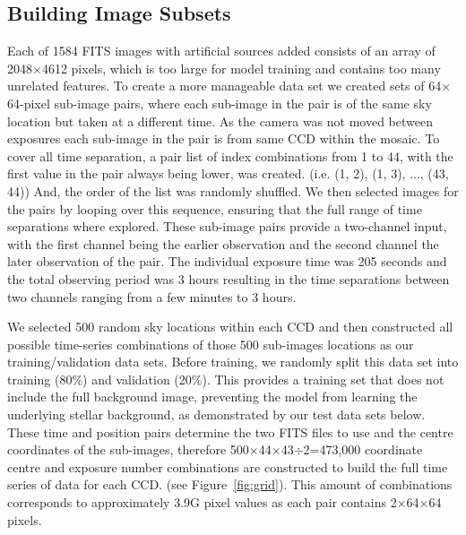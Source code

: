 \subsection{Building Image Subsets}
\label{subsect:subsets}
Each of 1584 FITS images with artificial sources added consists of an array of 2048$\times$4612 pixels, which is too large for model training and contains too many unrelated features.  
To create a more manageable data set we created sets of 64$\times$64-pixel sub-image pairs, where each sub-image in the pair is of the same sky location but taken at a different time.
As the camera was not moved between exposures each sub-image in the pair is from same CCD within the mosaic.
To cover all time separation, a pair list of index combinations from 1 to 44, with the first value in the pair always being lower, was created. (i.e. (1, 2), (1, 3), ..., (43, 44))
And, the order of the list was randomly shuffled.
We then selected images for the pairs by looping over this sequence, ensuring that the full range of time separations where  explored.
These sub-image pairs provide a two-channel input, with the first channel being the earlier observation and the second channel the later observation of the pair. 
The individual exposure time was 205 seconds and the total observing period was 3 hours resulting in the time separations between two channels ranging from a few minutes to 3 hours. 

We selected 500 random sky locations within each CCD and then constructed all possible time-series combinations of those 500 sub-images locations as our training/validation data sets.
Before training, we randomly split this data set into training (80\%) and validation (20\%).
This provides a training set that does not include the full background image, preventing the model from learning the underlying stellar background, as demonstrated by our test data sets below.
These time and position pairs determine the two FITS files to use and the centre coordinates of the sub-images, therefore 500$\times$44$\times$43$\div2$=473,000 coordinate centre and exposure number combinations are constructed to build the full time series of data for each CCD. (see Figure~\ref{fig:grid}).
This amount of combinations corresponds to approximately 3.9G pixel values as each pair contains 2$\times$64$\times$64 pixels.

